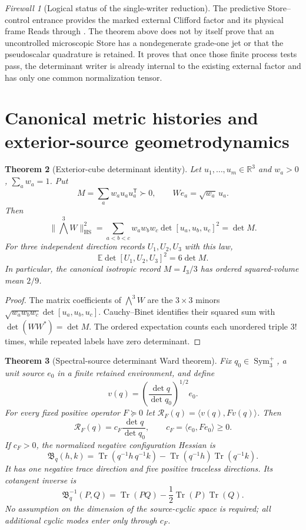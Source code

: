 \documentclass[11pt]{article}
\newtheorem{theorem}{Theorem}[section]
\theoremstyle{definition}
\theoremstyle{remark}
\newtheorem{firewall}[theorem]{Firewall}
\newcommand{\R}{\mathbb R}
\newcommand{\Tr}{\operatorname{Tr}}
\newcommand{\norm}[1]{\lVert#1\rVert}
\newcommand{\HS}{\mathrm{HS}}
\begin{document}
\begin{firewall}[Logical status of the single-writer reduction]
The predictive Store--control entrance provides the marked external Clifford
factor and its physical frame Reads through
.  The theorem above does not by
itself prove that an uncontrolled microscopic Store has a nondegenerate
grade-one jet or that the pseudoscalar quadrature is retained.  It proves that
once those finite process tests pass, the determinant writer is already
internal to the existing external factor and has only one common normalization
tensor.
\end{firewall}

\section{Canonical metric histories and exterior-source geometrodynamics}
\label{sec:exterior-geometrodynamics}

\begin{theorem}[Exterior-cube determinant identity]
\label{thm:exterior-cube-master}
Let $u_1,\ldots,u_m\in\R^3$ and $w_a>0$, $\sum_aw_a=1$.  Put
\[
 M=\sum_aw_au_au_a^{\mathsf T}\succ0,
 \qquad
 We_a=\sqrt{w_a}\,u_a.
\]
Then
\[
 \boxed{
 \norm{\bigwedge^3W}_{\HS}^2
 =\sum_{a<b<c}w_aw_bw_c\det[u_a,u_b,u_c]^2
 =\det M.}
\]
For three independent direction records $U_1,U_2,U_3$ with this law,
\[
 \boxed{\mathbb E\det[U_1,U_2,U_3]^2=6\det M.}
\]
In particular, the canonical isotropic record $M=I_3/3$ has ordered
squared-volume mean $2/9$.
\end{theorem}

\begin{proof}
The matrix coefficients of $\bigwedge^3W$ are the $3\times3$ minors
$\sqrt{w_aw_bw_c}\det[u_a,u_b,u_c]$.  Cauchy--Binet identifies their squared
sum with $\det(WW^*)=\det M$.  The ordered expectation counts each unordered
triple $3!$ times, while repeated labels have zero determinant.
\end{proof}

\begin{theorem}[Spectral-source determinant Ward theorem]
\label{thm:spectral-source-Ward-master}
Fix $q_0\in\operatorname{Sym}_3^+$, a unit source $e_0$ in a finite retained
environment, and define
\[
 v(q)=\left(\frac{\det q}{\det q_0}\right)^{1/2}e_0.
\]
For every fixed positive operator $F\succeq0$ let
$\mathscr R_F(q)=\langle v(q),Fv(q)\rangle$.  Then
\[
 \boxed{
 \mathscr R_F(q)=c_F\frac{\det q}{\det q_0},
 \qquad c_F=\langle e_0,Fe_0\rangle\ge0.}
\]
If $c_F>0$, the normalized negative configuration Hessian is
\[
 \boxed{
 \mathfrak B_q(h,k)
 =\Tr(q^{-1}h\,q^{-1}k)
  -\Tr(q^{-1}h)\Tr(q^{-1}k).}
\]
It has one negative trace direction and five positive traceless directions.
Its cotangent inverse is
\[
 \boxed{
 \mathfrak B_q^{-1}(P,Q)
 =\Tr(PQ)-\frac12\Tr(P)\Tr(Q).}
\]
No assumption on the dimension of the source-cyclic space is required; all
additional cyclic modes enter only through $c_F$.
\end{theorem}
\end{document}

